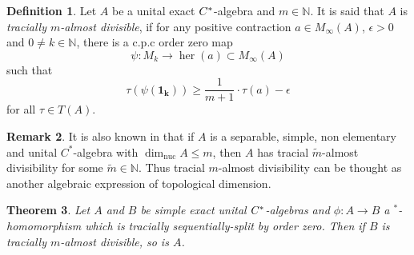 \documentclass[12pt]{amsart}
\theoremstyle{plain}
\newtheorem{thm}{Theorem}[section]
\theoremstyle{definition}
\newtheorem{defn}[thm]{Definition}
\newtheorem{rem}[thm]{Remark}
\def\dim{\operatorname{dim}}
\def\her{\operatorname{her}}
\def\nuc{\operatorname{nuc}}
\numberwithin{equation}{section}
\begin{document}
\begin{defn}\cite[Definition 2.5-(ii)]{W}
Let $A$ be a unital exact $C\sp*$-algebra and $m\in \mathbb{N}$. It is said that $A$ is \emph{tracially $m$-almost divisible}, if for any positive contraction $a \in M_{\infty}(A)$, $\epsilon >0$ and $0\neq k \in \mathbb{N}$, there is a c.p.c order zero map
\[ \psi: M_k \to \her(a) \subset M_{\infty}(A)\]
such that 
\[\tau(\psi(\mathbf{1_k})) \ge \frac{1}{m+1} \cdot \tau(a) -\epsilon \]
for all $\tau \in T(A)$. 
\end{defn}
\begin{rem}
It is also known in \cite[Proposition 3.7]{W} that if $A$ is a separable, simple, non elementary and unital $C^*$-algebra with $\dim_{\nuc}A \le
m$, then $A$ has tracial $\widetilde{m}$-almost divisibility for some $\widetilde{m} \in \mathbb{N}$. Thus tracial $m$-almost divisibility can be thought as another algebraic expression of topological dimension.
\end{rem}
\begin{thm}\label{T:divisibility}
Let $A$ and $B$ be  simple exact unital $C\sp*$-algebras and $\phi: A \to B $ a $^*$-homomorphism which is tracially sequentially-split by order zero. Then if $B$ is \emph{tracially $m$-almost divisible}, so is $A$. 
\end{thm}
\end{document}
